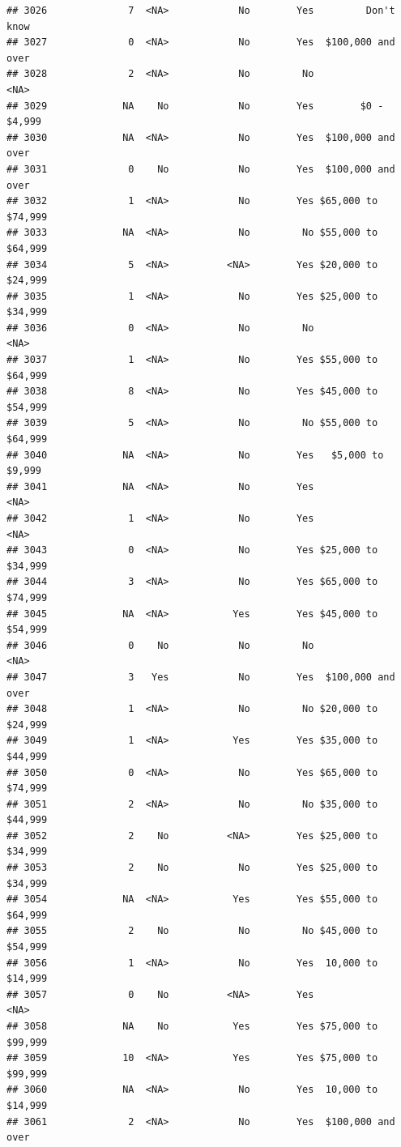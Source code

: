 \documentclass[man]{apa6}
\begin{document}
\begin{verbatim}
## 3026              7  <NA>            No        Yes         Don't know
## 3027              0  <NA>            No        Yes  $100,000 and over
## 3028              2  <NA>            No         No               <NA>
## 3029             NA    No            No        Yes        $0 - $4,999
## 3030             NA  <NA>            No        Yes  $100,000 and over
## 3031              0    No            No        Yes  $100,000 and over
## 3032              1  <NA>            No        Yes $65,000 to $74,999
## 3033             NA  <NA>            No         No $55,000 to $64,999
## 3034              5  <NA>          <NA>        Yes $20,000 to $24,999
## 3035              1  <NA>            No        Yes $25,000 to $34,999
## 3036              0  <NA>            No         No               <NA>
## 3037              1  <NA>            No        Yes $55,000 to $64,999
## 3038              8  <NA>            No        Yes $45,000 to $54,999
## 3039              5  <NA>            No         No $55,000 to $64,999
## 3040             NA  <NA>            No        Yes   $5,000 to $9,999
## 3041             NA  <NA>            No        Yes               <NA>
## 3042              1  <NA>            No        Yes               <NA>
## 3043              0  <NA>            No        Yes $25,000 to $34,999
## 3044              3  <NA>            No        Yes $65,000 to $74,999
## 3045             NA  <NA>           Yes        Yes $45,000 to $54,999
## 3046              0    No            No         No               <NA>
## 3047              3   Yes            No        Yes  $100,000 and over
## 3048              1  <NA>            No         No $20,000 to $24,999
## 3049              1  <NA>           Yes        Yes $35,000 to $44,999
## 3050              0  <NA>            No        Yes $65,000 to $74,999
## 3051              2  <NA>            No         No $35,000 to $44,999
## 3052              2    No          <NA>        Yes $25,000 to $34,999
## 3053              2    No            No        Yes $25,000 to $34,999
## 3054             NA  <NA>           Yes        Yes $55,000 to $64,999
## 3055              2    No            No         No $45,000 to $54,999
## 3056              1  <NA>            No        Yes  10,000 to $14,999
## 3057              0    No          <NA>        Yes               <NA>
## 3058             NA    No           Yes        Yes $75,000 to $99,999
## 3059             10  <NA>           Yes        Yes $75,000 to $99,999
## 3060             NA  <NA>            No        Yes  10,000 to $14,999
## 3061              2  <NA>            No        Yes  $100,000 and over

\end{verbatim}
\end{document}
